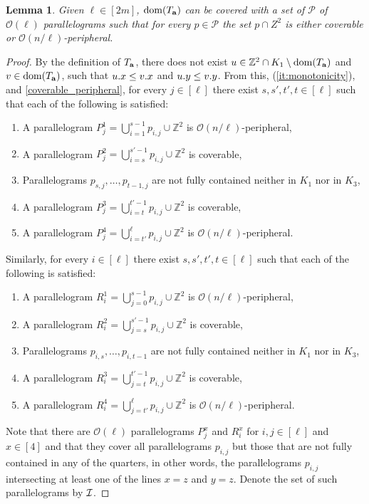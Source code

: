 \documentclass[11pt, letterpaper]{article}
\theoremstyle{plain}
\newtheorem{lemma}{Lemma}
\theoremstyle{definition}
\theoremstyle{remark}
\newcommand{\Z}{\mathbb{Z}}
\renewcommand{\O}{\mathcal{O}}
\begin{document}
\begin{lemma}\label{lm:parallelogram_merge}
Given $\ell \in [2m]$, $\operatorname*{dom}(T_\mathbf{a})$ can be covered with a set of $\mathcal{P}$ of $\O(\ell)$ parallelograms such that for every $p \in \mathcal{P}$ the set $p \cap Z^2$ is either coverable or $\O(n / \ell)$-peripheral. 
\end{lemma}
\begin{proof}
By the definition of $T_\mathbf{a}$, there does not exist $u \in \Z^2 \cap K_1 \setminus \d{\Ta}$ and $v \in \operatorname*{dom}(T_\mathbf{a})$, such that $u.x \le v.x$ and $u.y \le v.y$. From this,  (\ref{it:monotonicity}), and \ref{coverable_peripheral}, for every $j \in [\ell]$ there exist $s,s', t',t \in [\ell]$  such that each of the following is satisfied:
\begin{enumerate}
	\item A parallelogram $P_j^1 = \bigcup_{i=1}^{s-1} p_{i, j} \cup \Z^2$ is $\O(n/\ell)$-peripheral,
	\item A parallelogram $P_j^2 = \bigcup_{i=s}^{s'-1} p_{i, j} \cup \Z^2$ is coverable, 
	\item Parallelograms $p_{s, j}, \dots, p_{t - 1, j}$ are not fully contained neither in $K_1$ nor in $K_3$,
	\item A parallelogram $P_j^3 = \bigcup_{i=t}^{t'-1} p_{i, j} \cup \Z^2$ is coverable,
	\item A parallelogram $P_j^4 = \bigcup_{i=t'}^{\ell} p_{i, j} \cup \Z^2$ is $\O(n/\ell)$-peripheral.
\end{enumerate}

\noindent Similarly, for every $i \in [\ell]$ there exist $s,s', t',t \in [\ell]$  such that each of the following is satisfied:
\begin{enumerate}
	\item A parallelogram $R_i^1 = \bigcup_{j=0}^{s-1} p_{i, j} \cup \Z^2$ is $\O(n/\ell)$-peripheral,
	\item A parallelogram $R_i^2 = \bigcup_{j=s}^{s'-1} p_{i, j} \cup \Z^2$ is coverable, 
	\item Parallelograms $p_{i, s}, \dots, p_{i, t-1}$ are not fully contained neither in $K_1$ nor in $K_3$,
	\item A parallelogram $R_i^3 = \bigcup_{j=t}^{t'-1} p_{i, j} \cup \Z^2$ is coverable,
	\item A parallelogram $R_i^4 = \bigcup_{j=t'}^{\ell} p_{i, j} \cup \Z^2$ is $\O(n/\ell)$-peripheral. 
\end{enumerate}

Note that there are $\O(\ell)$ parallelograms $P_j^x$ and $R_i^x$ for $i,j \in [\ell]$ and $x \in [4]$ and that they cover all parallelograms $p_{i,j}$ but those that are not fully contained in any of the quarters, in other words, the parallelograms $p_{i, j}$ intersecting  at least one of the lines $x = z$ and $y = z$. Denote the set of such parallelograms by $\mathcal{I}$. 


\end{proof}
\end{document}

